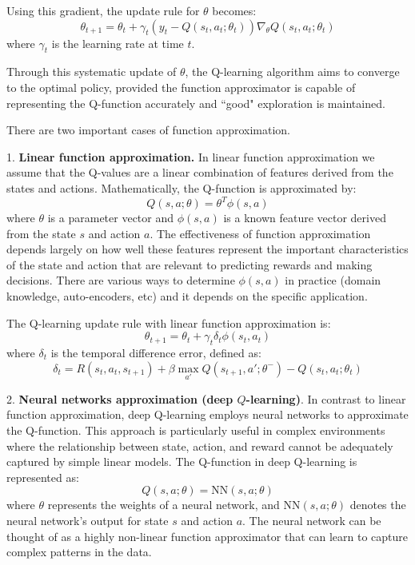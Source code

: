 \documentclass[letter,11pt]{article}
\begin{document}
Using this gradient, the update rule for \( \theta \) becomes:
\begin{equation} \label{eq:updatin_thetha}
     \theta_{t+1} = \theta_t + \gamma_t \left( y_t - Q(s_t, a_t; \theta_t) \right) \nabla_\theta Q(s_t, a_t; \theta_t) 
     \end{equation}
where \( \gamma_t \) is the learning rate at time \( t \).


Through this systematic update of \( \theta \), the Q-learning algorithm aims to converge to the optimal policy, provided the function approximator is capable of representing the Q-function accurately and ``good" exploration is maintained.





There are two important cases of function approximation.  

1. \textbf{Linear function approximation.} In linear function approximation we assume that the Q-values are a linear combination of features derived from the states and actions. Mathematically, the Q-function is approximated by:
\[
Q(s,a; \theta) = \theta^T \phi(s,a)
\]
where \( \theta \) is a parameter vector and \( \phi(s,a) \) is a known  feature vector derived from the state \( s \) and action \( a \). The effectiveness of function approximation depends largely on how well these features represent the important characteristics of the state and action that are relevant to predicting rewards and making decisions. There are various ways to determine $\phi(s,a)$ in practice (domain knowledge, auto-encoders, etc) and it depends on the specific application. 

The Q-learning update rule with linear function approximation is:
\[
\theta_{t+1} = \theta_t + \gamma_{t} \delta_t \phi(s_t, a_t)
\]
where \( \delta_t \) is the temporal difference error, defined as:
\[
\delta_t = R(s_{t},a_{t},s_{t+1}) + \beta \max_{a'} Q(s_{t+1}, a'; \theta^{-}) - Q(s_t, a_t; \theta_{t})
\]



2. \textbf{Neural networks approximation (deep $Q$-learning)}. In contrast to linear function approximation, deep Q-learning employs neural networks to approximate the Q-function. This approach is particularly useful in complex environments where the relationship between state, action, and reward cannot be adequately captured by simple linear models. The Q-function in deep Q-learning is represented as:
\[
Q(s, a; \theta) = \text{NN}(s, a; \theta)
\]
where \( \theta \) represents the weights of a neural network, and \( \text{NN}(s, a; \theta) \) denotes the neural network's output for state \( s \) and action \( a \). The neural network can be thought of as a highly non-linear function approximator that can learn to capture complex patterns in the data.
\end{document}
